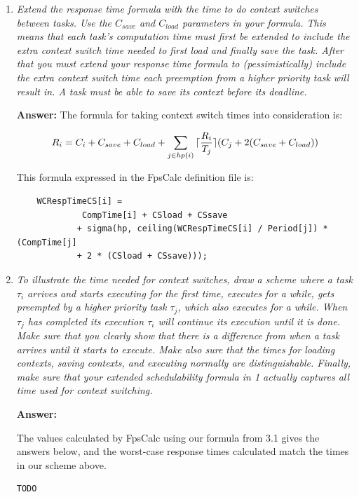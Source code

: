 \documentclass[a4paper,10pt]{article}
\DeclarePairedDelimiter{\ceil}{\lceil}{\rceil}
\newcommand{\answer}{\textbf{Answer: }}
\begin{document}
\begin{enumerate}
	\item \emph{Extend the response time formula with the time to do context switches between tasks. Use the $C_{save}$ and $C_{load}$ parameters in your formula. This means that each task's computation time must first be extended to include the extra context switch time needed to first load and finally save the task. After that you must extend your response time formula to (pessimistically) include the extra context switch time each preemption from a higher priority task will result in. A task must be able to save its context before its deadline.}
	
	\answer The formula for taking context switch times into consideration is:
	
	\begin{equation*}
	R_i = C_i + C_{save} + C_{load} + \sum_{j \in hp(i)}{\ceil{\frac{R_i}{T_j}} (C_j + 2(C_{save} + C_{load}))}
	\end{equation*}
	
	This formula expressed in the FpsCalc definition file is:
	
	\begin{lstlisting}
	WCRespTimeCS[i] =
			 CompTime[i] + CSload + CSsave 
			+ sigma(hp, ceiling(WCRespTimeCS[i] / Period[j]) * (CompTime[j]
			+ 2 * (CSload + CSsave)));
	\end{lstlisting}
	
	\item \emph{To illustrate the time needed for context switches, draw a scheme where a task $\tau_i$ arrives and starts executing for the first time, executes for a while, gets preempted by a higher priority task $\tau_j$, which also executes for a while. When $\tau_j$ has completed its execution $\tau_i$ will continue its execution until it is done. Make sure that you clearly show that there is a difference from when a task arrives until it starts to execute. Make also sure that the times for loading contexts, saving contexts, and executing normally are distinguishable. Finally, make sure that your extended schedulability formula in 1 actually captures all time used for context switching.}
	
	\answer {}
	
	The values calculated by FpsCalc using our formula from 3.1 gives the answers below, and the worst-case response times calculated match the times in our scheme above.
	
\begin{lstlisting}[language=bash]
TODO
\end{lstlisting}
	

\end{enumerate}
\end{document}
